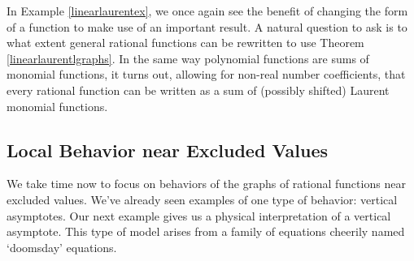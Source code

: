 In Example \ref{linearlaurentex}, we once again see the benefit of changing the form of a function to make use of an important result.  A natural question to ask is to what extent general rational functions can be rewritten to use Theorem \ref{linearlaurentlgraphs}.  In the same way polynomial functions are sums of monomial functions, it turns out, allowing for non-real number coefficients,  that every rational function can be written as a sum of (possibly shifted) Laurent monomial functions.

\subsection{Local Behavior near Excluded Values}
\label{vaorholesection}

We take time now to focus on behaviors of the graphs of rational functions near excluded values.  We've already seen examples of one type of behavior:  vertical asymptotes.  Our next example gives us a physical interpretation of a vertical asymptote.  This type of model arises from a family of equations cheerily named `doomsday' equations.  

